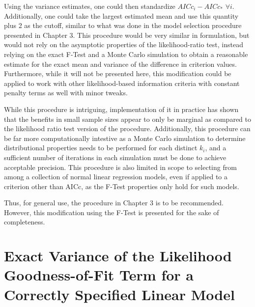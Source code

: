 Using the variance estimates, one could then standardize $AICc_i - AICc_*$ $\forall i$. Additionally, one could take the largest estimated
mean and use this quantity plus 2 as the cutoff, similar to what was done in the model selection procedure presented in Chapter 3. This
procedure would be very similar in formulation, but would not rely on the asymptotic properties of the likelihood-ratio test, instead
relying on the exact F-Test and a Monte Carlo simulation to obtain a reasonable estimate for the exact mean and variance of the difference
in criterion values. Furthermore, while it will not be presented here, this modification could be applied to work with other likelihood-based
information criteria with constant penalty terms as well with minor tweaks.

While this procedure is intriguing, implementation of it in practice has shown that the benefits in small sample sizes appear to only be
marginal as compared to the likelihood ratio test version of the procedure. Additionally, this procedure can be far more computationally
intestive as a Monte Carlo simulation to determine distributional properties needs to be performed for each distinct $k_i$, and a sufficient
number of iterations in each simulation must be done to achieve acceptable precision. This procedure is also limited in scope to selecting
from among a collection of normal linear regression models, even if applied to a criterion other than AICc, as the F-Test properties only hold
for such models.

Thus, for general use, the procedure in Chapter 3 is to be recommended. However, this modification using the F-Test is presented for the
sake of completeness.


\section*{Exact Variance of the Likelihood Goodness-of-Fit Term for a Correctly Specified Linear Model}

